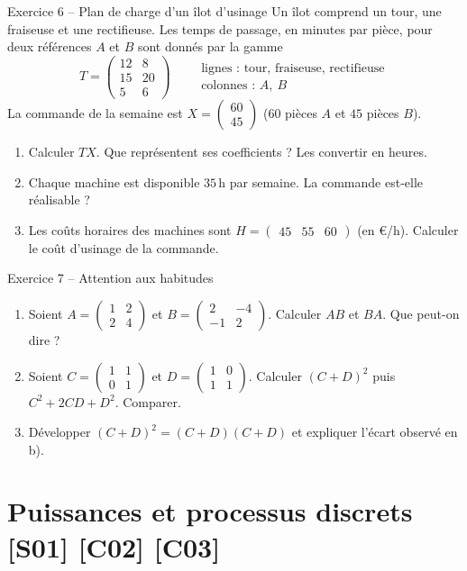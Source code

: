 \documentclass[a4paper,11pt]{article}
\newcommand{\M}[1]{\begin{pmatrix}#1\end{pmatrix}}
\begin{document}
\begin{exo}{Exercice 6 -- Plan de charge d'un îlot d'usinage}
\label{exo:6}
Un îlot comprend un tour, une fraiseuse et une rectifieuse. Les temps de passage, en minutes par pièce, pour deux références $A$ et $B$ sont donnés par la gamme
\[
T = \M{12 & 8\\ 15 & 20\\ 5 & 6}
\qquad
\begin{array}{l}\text{lignes : tour, fraiseuse, rectifieuse}\\ \text{colonnes : } A,\ B\end{array}
\]
La commande de la semaine est $X = \M{60\\45}$ ($60$ pièces $A$ et $45$ pièces $B$).
\begin{enumerate}[label=\alph*)]
  \item Calculer $TX$. Que représentent ses coefficients ? Les convertir en heures.
  \item Chaque machine est disponible $35$\,h par semaine. La commande est-elle réalisable ?
  \item Les coûts horaires des machines sont $H = \M{45 & 55 & 60}$ (en €/h). Calculer le coût d'usinage de la commande.
\end{enumerate}
\end{exo}

\begin{exo}{Exercice 7 -- Attention aux habitudes}
\label{exo:7}
\begin{enumerate}[label=\alph*)]
  \item Soient $A = \M{1 & 2\\ 2 & 4}$ et $B = \M{2 & -4\\ -1 & 2}$. Calculer $AB$ et $BA$. Que peut-on dire ?
  \item Soient $C = \M{1 & 1\\ 0 & 1}$ et $D = \M{1 & 0\\ 1 & 1}$. Calculer $(C+D)^2$ puis $C^2 + 2CD + D^2$. Comparer.
  \item Développer $(C+D)^2 = (C+D)(C+D)$ et expliquer l'écart observé en b).
\end{enumerate}
\end{exo}

\needspace{7cm}
\section{Puissances et processus discrets \hfill {\normalsize\color{uimmred}[S01] [C02] [C03]}}
\end{document}
